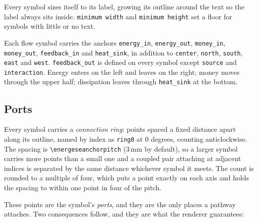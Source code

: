 \documentclass{article}
\begin{document}
\begin{center}
\end{center}

Every symbol sizes itself to its label, growing its outline around the text so
the label always sits inside. \texttt{minimum width} and \texttt{minimum height}
set a floor for symbols with little or no text.

Each flow symbol carries the anchors \texttt{energy\_in}, \texttt{energy\_out},
\texttt{money\_in}, \texttt{money\_out}, \texttt{feedback\_in} and
\texttt{heat\_sink}, in addition to \texttt{center}, \texttt{north},
\texttt{south}, \texttt{east} and \texttt{west}. \texttt{feedback\_out} is
defined on every symbol except \texttt{source} and \texttt{interaction}. Energy
enters on the left and leaves on the right; money moves through the upper half;
dissipation leaves through \texttt{heat\_sink} at the bottom.

\subsection{Ports}
\label{sec:ports}

Every symbol carries a \emph{connection ring}: points spaced a fixed distance
apart along its outline, named by index as \texttt{ring0} at $0$ degrees,
counting anticlockwise. The spacing is \verb|\energeseanchorpitch| ($3$\,mm by
default), so a larger symbol carries more points than a small one and a coupled
pair attaching at adjacent indices is separated by the same distance whichever
symbol it meets. The count is rounded to a multiple of four, which puts a point
exactly on each axis and holds the spacing to within one point in four of the
pitch.

These points are the symbol's \emph{ports}, and they are the only places a
pathway attaches. Two consequences follow, and they are what the renderer
guarantees:
\end{document}
